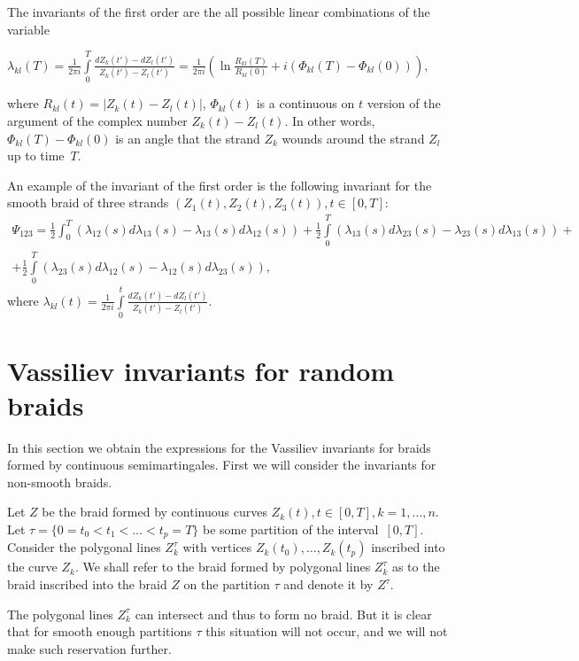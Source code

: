 \documentclass[12pt, a4paper, titlepage]{article}
\begin{document}
\begin{example}
 The invariants of the first order are the all possible linear combinations of 
the variable
\begin{center}
$\lambda_{kl}(T)=\frac{1}{2\pi i}\int\limits_{0}^T\frac{dZ_k(t')-dZ_l(t')}{Z_k(t')-Z_l(t')}=
\frac{1}{2\pi i} \left( \ln \frac{R_{kl}(T)}{R_{kl}(0)}+i(\Phi_{kl}(T)-\Phi_{kl}(0))\right),$
\end{center}
where $R_{kl}(t)=|Z_k(t)-Z_l(t)|$,
$\Phi_{kl}(t)$ is a continuous on $t$ version of the argument of the complex number
$Z_k(t)-Z_l(t)$. In other words,
$\Phi_{kl}(T)-\Phi_{kl}(0)$ is an angle that the strand $Z_k$ wounds around the strand $Z_l$
up to time~$T$.
\end{example}

\begin{example}\label{smoothIntegralExample}\cite{Berger}
 An example of the invariant of the first order is the following invariant 
for the smooth braid of three strands $(Z_1(t),Z_2(t),Z_3(t)), t \in [0, T]$:
\begin{multline*}
 \Psi_{123}=\frac12 \int_0^T(\lambda_{12}(s)d\lambda_{13}(s)-\lambda_{13}(s)d\lambda_{12}(s))+
\frac12 \int\limits_0^T(\lambda_{13}(s)d\lambda_{23}(s)-\lambda_{23}(s)d\lambda_{13}(s))+\\+
\frac12 \int\limits_0^T(\lambda_{23}(s)d\lambda_{12}(s)-\lambda_{12}(s)d\lambda_{23}(s)),
\end{multline*}
where $\lambda_{kl}(t)=\frac{1}{2\pi i}\int\limits_{0}^t\frac{dZ_k(t')-dZ_l(t')}{Z_k(t')-Z_l(t')}$.
\end{example}

\section{Vassiliev invariants for random braids}\label{nonSmoothVassiliev}

In this section we obtain the expressions for the Vassiliev invariants for 
braids formed by continuous semimartingales. First we will consider the invariants
for non-smooth braids. 

\begin{definition}
  Let $Z$ be the braid formed by continuous curves $Z_k(t), t\in [0,T], k = 1,\ldots, n$. Let
$\tau = \{0=t_0<t_1<\dots<t_p=T\}$ be some partition of the interval~$[0,T]$.
Consider the polygonal lines $Z_k^{\tau}$ with vertices $Z_k(t_0), \ldots, Z_k(t_p)$
inscribed into the curve $Z_k$. We shall refer to the braid formed by polygonal lines 
$Z_k^{\tau}$ as to the braid inscribed into the braid $Z$ on the partition $\tau$ and denote 
it by $Z^{\tau}$.
\end{definition}
\begin{remark}
The polygonal lines $Z_k^{\tau}$ can intersect and thus to form no braid. 
But it is clear that for smooth enough partitions $\tau$
this situation will not occur, and we will not make such reservation further.  
\end{remark}
\end{document}
